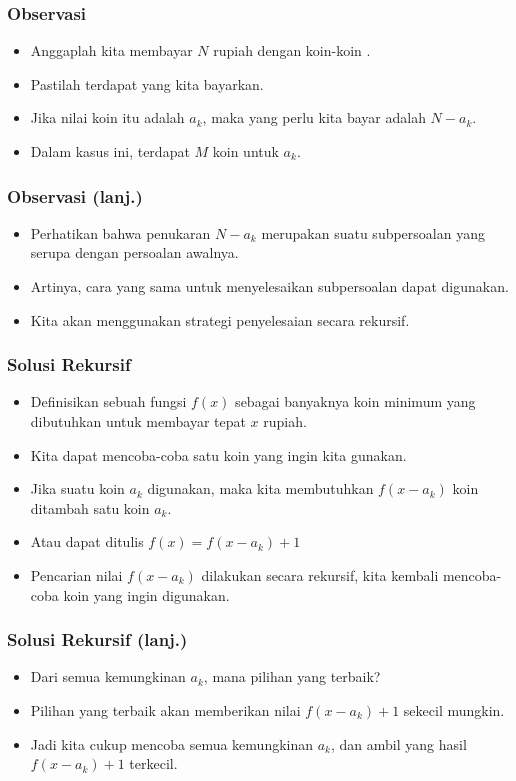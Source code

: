\begin{frame}
\frametitle{Observasi}
\begin{itemize}
  \item Anggaplah kita membayar $N$ rupiah dengan koin-koin .
  \item Pastilah terdapat  yang kita bayarkan.
  \item Jika nilai koin itu adalah $a_k$, maka  yang perlu kita bayar adalah $N-a_k$.
  \item Dalam kasus ini, terdapat $M$  koin untuk $a_k$.
\end{itemize}
\end{frame}

\begin{frame}
\frametitle{Observasi (lanj.)}
\begin{itemize}
  \item Perhatikan bahwa penukaran $N - a_k$ merupakan suatu subpersoalan yang serupa dengan persoalan awalnya.
  \item Artinya, cara yang sama untuk menyelesaikan subpersoalan dapat digunakan.
  \item Kita akan menggunakan strategi penyelesaian secara rekursif.
\end{itemize}
\end{frame}

\begin{frame}
\frametitle{Solusi Rekursif}
\begin{itemize}
  \item Definisikan sebuah fungsi $f(x)$ sebagai banyaknya koin minimum yang dibutuhkan untuk membayar tepat $x$ rupiah.
  \item Kita dapat mencoba-coba satu koin yang ingin kita gunakan.
  \item Jika suatu koin $a_k$ digunakan, maka kita membutuhkan $f(x-a_k)$ koin ditambah satu koin $a_k$.
  \item Atau dapat ditulis $f(x) = f(x-a_k) + 1$
  \item Pencarian nilai $f(x-a_k)$ dilakukan secara rekursif, kita kembali mencoba-coba koin yang ingin digunakan.
\end{itemize}
\end{frame}

\begin{frame}
\frametitle{Solusi Rekursif (lanj.)}
\begin{itemize}
  \item Dari semua kemungkinan $a_k$, mana pilihan yang terbaik?
  \item Pilihan yang terbaik akan memberikan nilai $f(x - a_k) + 1$ sekecil mungkin.
  \item Jadi kita cukup mencoba semua kemungkinan $a_k$, dan ambil yang hasil $f(x - a_k) + 1$ terkecil.
\end{itemize}
\end{frame}

